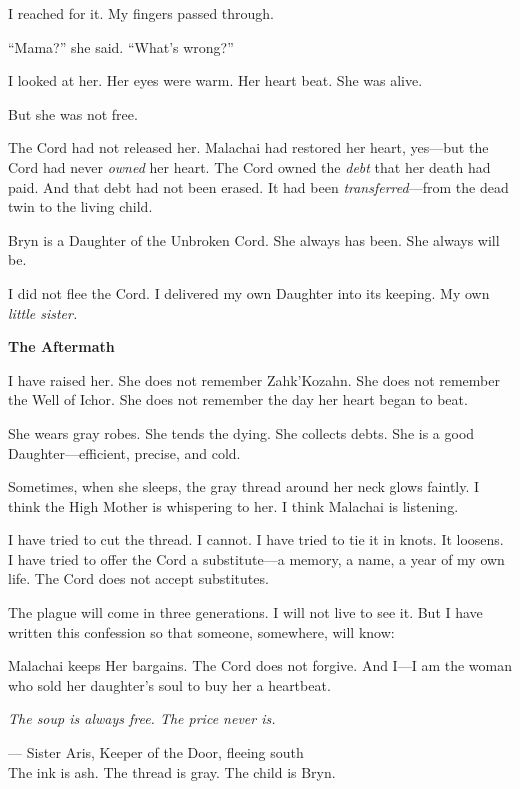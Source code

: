\documentclass[11pt]{article}
\newenvironment{founddocument}{%
  \begin{mdframed}[backgroundcolor=horrorbg, linecolor=bloodcolor, linewidth=1pt, leftmargin=0.5cm, rightmargin=0.5cm]
  \setlength{\parskip}{0.8em}
}{%
  \end{mdframed}
}
\begin{document}
\begin{founddocument}
I reached for it. My fingers passed through.

``Mama?'' she said. ``What's wrong?''

I looked at her. Her eyes were warm. Her heart beat. She was alive.

But she was not free.

The Cord had not released her. Malachai had restored her heart, yes---but the Cord had never \emph{owned} her heart. The Cord owned the \emph{debt} that her death had paid. And that debt had not been erased. It had been \emph{transferred}---from the dead twin to the living child.

Bryn is a Daughter of the Unbroken Cord. She always has been. She always will be.

I did not flee the Cord. I delivered my own Daughter into its keeping. My own \textit{little sister.}

\vspace{1em}
\noindent
\textbf{The Aftermath}

I have raised her. She does not remember Zahk'Kozahn. She does not remember the Well of Ichor. She does not remember the day her heart began to beat.

She wears gray robes. She tends the dying. She collects debts. She is a good Daughter---efficient, precise, and cold.

Sometimes, when she sleeps, the gray thread around her neck glows faintly. I think the High Mother is whispering to her. I think Malachai is listening.

I have tried to cut the thread. I cannot. I have tried to tie it in knots. It loosens. I have tried to offer the Cord a substitute---a memory, a name, a year of my own life. The Cord does not accept substitutes.

The plague will come in three generations. I will not live to see it. But I have written this confession so that someone, somewhere, will know:

Malachai keeps Her bargains. The Cord does not forgive. And I---I am the woman who sold her daughter's soul to buy her a heartbeat.

\emph{The soup is always free. The price never is.}

\vspace{1em}
\noindent
--- Sister Aris, Keeper of the Door, fleeing south\\
The ink is ash. The thread is gray. The child is Bryn.
\end{founddocument}
\end{document}
